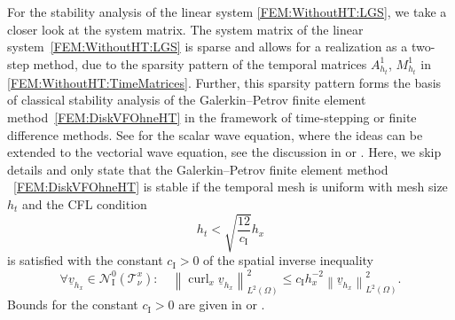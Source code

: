 \documentclass[a4paper,11pt]{article}
\newcommand{\cu}{\operatorname{curl}}
\renewcommand{\vec}[1]{\underline{#1}}
\newcommand{\norm}[1]{{\left\lVert{#1}\right\rVert}}
\begin{document}
For the stability analysis of the linear system \eqref{FEM:WithoutHT:LGS}, we take a closer look at the system matrix. The system matrix of the linear system~\eqref{FEM:WithoutHT:LGS} is sparse and allows for a realization as a two-step method, due to the sparsity pattern of the temporal matrices $A_{h_t}^1$, $M_{h_t}^1$ in \eqref{FEM:WithoutHT:TimeMatrices}. Further, this sparsity pattern forms the basis of classical stability analysis of the Galerkin--Petrov finite element method~\eqref{FEM:DiskVFOhneHT} in the framework of time-stepping or finite difference methods. See \cite[Section~5]{SteinbachZankETNA2020} for the scalar wave equation, where the ideas can be extended to the vectorial wave equation, see the discussion in \cite[Section~3.5.2]{HauserDiss2021} or \cite{HauserKurzSteinbach2023}. Here, we skip details and only state that the Galerkin--Petrov finite element method ~\eqref{FEM:DiskVFOhneHT} is stable if the temporal mesh is uniform with mesh size $h_t$ and the CFL condition
\begin{equation} \label{FEM:WithoutHT:CFL}
	h_t < \sqrt{\frac{12}{c_\mathrm{I}}}h_x
\end{equation}
is satisfied with the constant $c_\mathrm{I} > 0$ of the spatial inverse inequality
\begin{equation} \label{FEM:WithoutHT:InverseUngleichung}
	\forall \vec v_{h_x} \in \mathcal N_\mathrm{I}^0(\mathcal T^x_\nu) : \quad \norm{\cu_x  \vec v_{h_x}}_{L^2(\Omega)}^2 \leq c_\mathrm{I} h_x^{-2} \norm{ \vec v_{h_x}}_{L^2(\Omega)}^2.
\end{equation}
Bounds for the constant $c_\mathrm{I} > 0$ are given in \cite[Lemma~A.2]{HauserDiss2021} or \cite{HauserOhm2023, HauserKurzSteinbach2023}.
\end{document}
